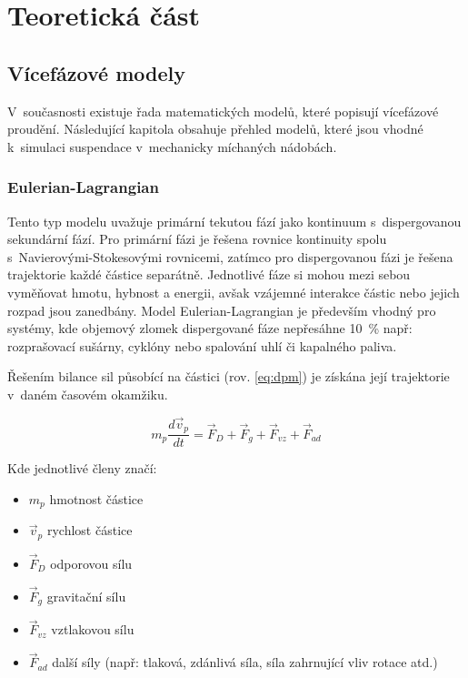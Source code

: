 \chapter{Teoretická část}

\section{Vícefázové modely}
V~současnosti existuje řada matematických modelů, které popisují vícefázové proudění. Následující kapitola obsahuje přehled modelů, které jsou vhodné k~simulaci suspendace v~mechanicky míchaných nádobách.

\subsection{Eulerian-Lagrangian}
Tento typ modelu uvažuje primární tekutou fází jako kontinuum s~dispergovanou sekundární fází. Pro primární fázi je řešena rovnice kontinuity spolu s~Navierovými-Stokesovými rovnicemi, zatímco pro dispergovanou fázi je řešena trajektorie každé částice separátně. Jednotlivé fáze si mohou mezi sebou vyměňovat hmotu, hybnost a energii, avšak vzájemné interakce částic nebo jejich rozpad jsou zanedbány. Model Eulerian-Lagrangian je především vhodný pro systémy, kde objemový zlomek dispergované fáze nepřesáhne \SI{10}{\percent} např: rozprašovací sušárny, cyklóny nebo spalování uhlí či kapalného paliva. 

Řešením bilance sil působící na částici (rov. \ref{eq:dpm}) je získána její trajektorie v~daném časovém okamžiku.

\begin{equation}
	m_{p}\frac{d\vec{v}_{p}}{dt} = \vec{F}_{D} + \vec{F}_{g} + \vec{F}_{vz} + \vec{F}_{ad}
	\label{eq:dpm}
\end{equation} 

\noindent Kde jednotlivé členy značí:

\begin{itemize}[itemsep=0pt,parsep=0pt,partopsep=0pt,topsep=0pt]
  \item $m_{p}$ hmotnost částice
  \item $\vec{v}_{p}$ rychlost částice
  \item $\vec{F}_{D}$ odporovou sílu
  \item $\vec{F}_{g}$ gravitační sílu
  \item $\vec{F}_{vz}$ vztlakovou sílu
  \item $\vec{F}_{ad}$ další síly (např: tlaková, zdánlivá síla, síla zahrnující vliv rotace atd.)
\end{itemize}


